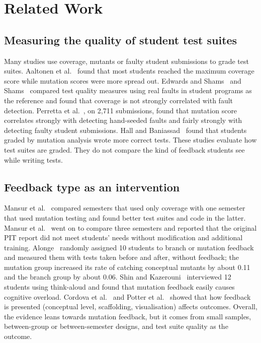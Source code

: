 \section{Related Work}
\label{sec:related}

\subsection{Measuring the quality of student test suites}
Many studies use coverage, mutants or faulty student submissions to grade test suites. Aaltonen et al.~\cite{aaltonen2010} found that most students reached the maximum coverage score while mutation scores were more spread out. Edwards and Shams~\cite{edwards2014} and Shams~\cite{shams2015} compared test quality measures using real faults in student programs as the reference and found that coverage is not strongly correlated with fault detection. Perretta et al.~\cite{perretta2022}, on 2,711 submissions, found that mutation score correlates strongly with detecting hand-seeded faults and fairly strongly with detecting faulty student submissions. Hall and Baniassad~\cite{hall2022} found that students graded by mutation analysis wrote more correct tests. These studies evaluate how test suites are graded. They do not compare the kind of feedback students see while writing tests.

\subsection{Feedback type as an intervention}
Mansur et al.~\cite{mansur2024} compared semesters that used only coverage with one semester that used mutation testing and found better test suites and code in the latter. Mansur et al.~\cite{mansur2026} went on to compare three semesters and reported that the original PIT report did not meet students' needs without modification and additional training. Alonge~\cite{alonge2025} randomly assigned 10 students to branch or mutation feedback and measured them with tests taken before and after, without feedback; the mutation group increased its rate of catching conceptual mutants by about 0.11 and the branch group by about 0.06. Shin and Kazerouni~\cite{shin2024} interviewed 12 students using think-aloud and found that mutation feedback easily causes cognitive overload. Cordova et al.~\cite{cordova2021} and Potter et al.~\cite{potter2025} showed that how feedback is presented (conceptual level, scaffolding, visualisation) affects outcomes. Overall, the evidence leans towards mutation feedback, but it comes from small samples, between-group or between-semester designs, and test suite quality as the outcome.

